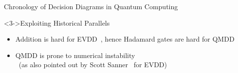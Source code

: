 \begin{refframe}{Chronology of Decision Diagrams in Quantum Computing}
\begin{alertblock}<3->{Exploiting Historical Parallels}
	\begin{itemize}
	\item<+-> Addition is hard for EVDD~\cite{fargier2013semiring}, hence Hadamard gates are hard for QMDD
	\item<+-> QMDD is prone to numerical instability~\cite{niemann2020overcoming}
		\\
		
		 \phantom{ZZZZZZZZZZZZZZZZZ}~(as also pointed out by Scott Sanner~\cite{aadd} for EVDD)
	\end{itemize}
\end{alertblock}


\end{refframe}




